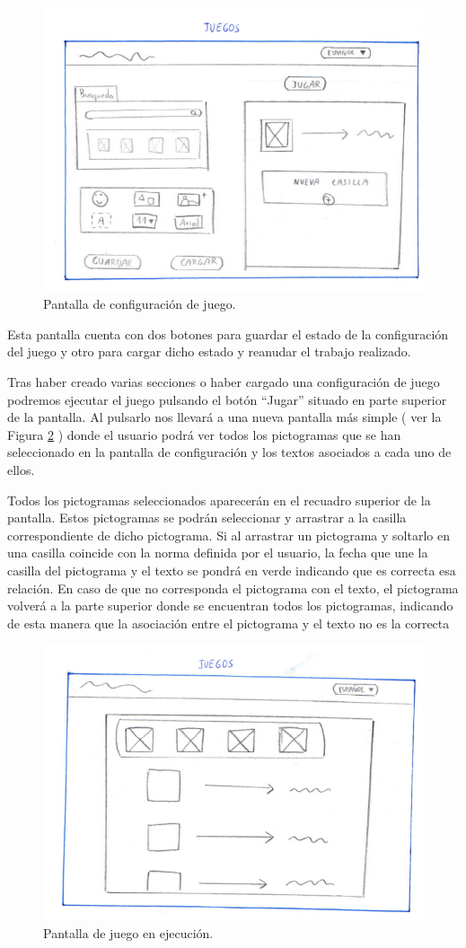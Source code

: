 	\begin{figure}[h!]
		\centering
		\includegraphics[width=0.7\linewidth]{Imagenes/Bitmap/juegosJorge}
		\caption{Pantalla de configuración de juego.}
		\label{fig:juegosjorge}
	\end{figure}

	Esta pantalla cuenta con dos botones para guardar el estado de la configuración del juego y otro para cargar dicho estado y reanudar el trabajo realizado.
	
	Tras haber creado varias secciones o haber cargado una configuración de juego podremos ejecutar el juego pulsando el botón “Jugar” situado en parte superior de la pantalla. Al pulsarlo nos llevará a una nueva pantalla más simple ( ver la Figura \ref{fig:juegojorge} ) donde el usuario podrá ver todos los pictogramas que se han seleccionado en la pantalla de configuración y los textos asociados a cada uno de ellos.
	
	Todos los pictogramas seleccionados aparecerán en el recuadro superior de la pantalla. Estos pictogramas se podrán seleccionar y arrastrar a la casilla correspondiente de dicho pictograma. Si al arrastrar un pictograma y soltarlo en una casilla coincide con la norma definida por el usuario, la fecha que une la casilla del pictograma y el texto se pondrá en verde indicando que es correcta esa relación. En caso de que no corresponda el pictograma con el texto, el pictograma volverá a la parte superior donde se encuentran todos los pictogramas, indicando de esta manera que la asociación entre el pictograma y el texto no es la correcta
	 
	

	\begin{figure}[h!]
	\centering
	\includegraphics[width=0.7\linewidth]{Imagenes/Bitmap/juegoJorge}
	\caption{Pantalla de juego en ejecución.}
	\label{fig:juegojorge}
	\end{figure}
	

